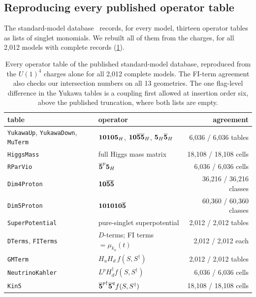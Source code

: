 \subsection{Reproducing every published operator table}

The standard-model database~\cite{AGLP2012,OxfordCICY} records, for every model,
thirteen operator tables as lists of singlet monomials. We rebuilt all of them
from the charges, for all 2,012 models with complete records (\cref{tab:operators}).

\begin{table}[t]
\centering\small
\begin{tabular}{@{}llr@{}}
\toprule
table & operator & agreement \\
\midrule
\texttt{YukawaUp}, \texttt{YukawaDown}, \texttt{MuTerm} & $\mathbf{10}\mathbf{10}\mathbf{5}_H$, $\mathbf{10}\overline{\mathbf{5}}\overline{\mathbf{5}}_H$, $\mathbf{5}_H\overline{\mathbf{5}}_H$ & 6,036 / 6,036 tables \\
\texttt{HiggsMass} & full Higgs mass matrix & 18,108 / 18,108 cells \\
\texttt{RParVio} & $\overline{\mathbf{5}}^p\mathbf{5}_H$ & 6,036 / 6,036 cells \\
\texttt{Dim4Proton} & $\mathbf{10}\overline{\mathbf{5}}\overline{\mathbf{5}}$ & 36,216 / 36,216 classes \\
\texttt{Dim5Proton} & $\mathbf{10}\mathbf{10}\mathbf{10}\overline{\mathbf{5}}$ & 60,360 / 60,360 classes \\
\texttt{SuperPotential} & pure-singlet superpotential & 2,012 / 2,012 tables \\
\texttt{DTerms}, \texttt{FITerms} & $D$-terms; FI terms $=\mu_{k_a}(t)$ & 2,012 / 2,012 each \\
\texttt{GMTerm} & $H_uH_d\,f(S,S^\dagger)$ & 2,012 / 2,012 tables \\
\texttt{NeutrinoKahler} & $L^pH_d^\dagger f(S,S^\dagger)$ & 6,036 / 6,036 cells \\
\texttt{Kin5} & $\overline{\mathbf{5}}^{p\dagger}\overline{\mathbf{5}}^q f(S,S^\dagger)$ & 18,108 / 18,108 cells \\
\bottomrule
\end{tabular}
\caption{Every operator table of the published standard-model database,
reproduced from the $U(1)^4$ charges alone for all 2,012 complete models. The
FI-term agreement also checks our intersection numbers on all 13 geometries.
The one flag-level difference in the Yukawa tables is a coupling first allowed
at insertion order six, above the published truncation, where both lists are
empty.}
\label{tab:operators}
\end{table}

